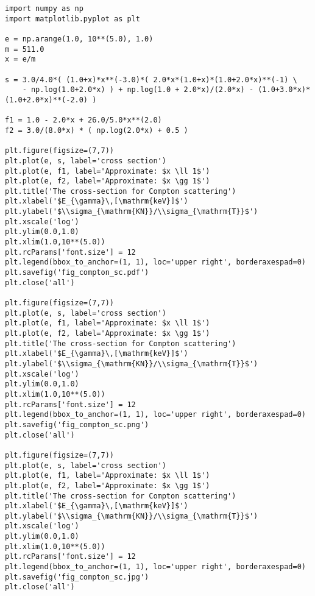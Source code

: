 \begin{lstlisting}[caption = hogehoge,label = code_1_1_1]
import numpy as np
import matplotlib.pyplot as plt

e = np.arange(1.0, 10**(5.0), 1.0)
m = 511.0
x = e/m

s = 3.0/4.0*( (1.0+x)*x**(-3.0)*( 2.0*x*(1.0+x)*(1.0+2.0*x)**(-1) \
    - np.log(1.0+2.0*x) ) + np.log(1.0 + 2.0*x)/(2.0*x) - (1.0+3.0*x)*(1.0+2.0*x)**(-2.0) )

f1 = 1.0 - 2.0*x + 26.0/5.0*x**(2.0)
f2 = 3.0/(8.0*x) * ( np.log(2.0*x) + 0.5 )

plt.figure(figsize=(7,7))
plt.plot(e, s, label='cross section')
plt.plot(e, f1, label='Approximate: $x \ll 1$')
plt.plot(e, f2, label='Approximate: $x \gg 1$')
plt.title('The cross-section for Compton scattering')
plt.xlabel('$E_{\gamma}\,[\mathrm{keV}]$')
plt.ylabel('$\\sigma_{\mathrm{KN}}/\\sigma_{\mathrm{T}}$')
plt.xscale('log')
plt.ylim(0.0,1.0)
plt.xlim(1.0,10**(5.0))
plt.rcParams['font.size'] = 12
plt.legend(bbox_to_anchor=(1, 1), loc='upper right', borderaxespad=0)
plt.savefig('fig_compton_sc.pdf')
plt.close('all')

plt.figure(figsize=(7,7))
plt.plot(e, s, label='cross section')
plt.plot(e, f1, label='Approximate: $x \ll 1$')
plt.plot(e, f2, label='Approximate: $x \gg 1$')
plt.title('The cross-section for Compton scattering')
plt.xlabel('$E_{\gamma}\,[\mathrm{keV}]$')
plt.ylabel('$\\sigma_{\mathrm{KN}}/\\sigma_{\mathrm{T}}$')
plt.xscale('log')
plt.ylim(0.0,1.0)
plt.xlim(1.0,10**(5.0))
plt.rcParams['font.size'] = 12
plt.legend(bbox_to_anchor=(1, 1), loc='upper right', borderaxespad=0)
plt.savefig('fig_compton_sc.png')
plt.close('all')

plt.figure(figsize=(7,7))
plt.plot(e, s, label='cross section')
plt.plot(e, f1, label='Approximate: $x \ll 1$')
plt.plot(e, f2, label='Approximate: $x \gg 1$')
plt.title('The cross-section for Compton scattering')
plt.xlabel('$E_{\gamma}\,[\mathrm{keV}]$')
plt.ylabel('$\\sigma_{\mathrm{KN}}/\\sigma_{\mathrm{T}}$')
plt.xscale('log')
plt.ylim(0.0,1.0)
plt.xlim(1.0,10**(5.0))
plt.rcParams['font.size'] = 12
plt.legend(bbox_to_anchor=(1, 1), loc='upper right', borderaxespad=0)
plt.savefig('fig_compton_sc.jpg')
plt.close('all')
\end{lstlisting}
